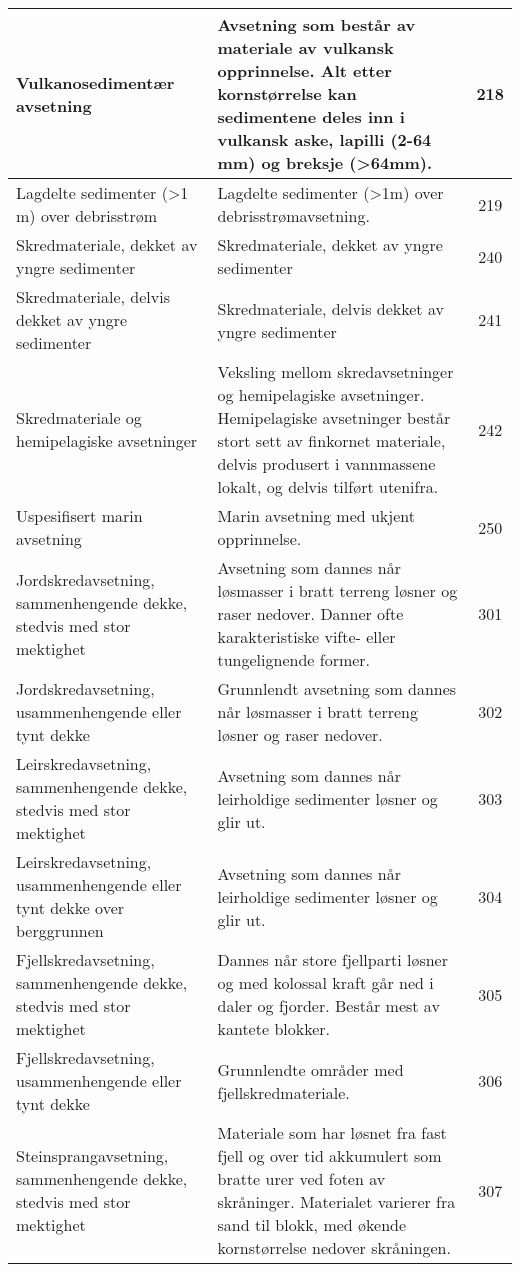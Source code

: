 \begin{longtable}{|p{3.5cm}|p{6.2cm}|c|}
    Vulkanosedimentær avsetning & Avsetning som består av materiale av vulkansk opprinnelse. Alt etter kornstørrelse kan sedimentene deles inn i vulkansk aske, lapilli (2-64 mm) og breksje (>64mm). & 218 \\ \hline
    Lagdelte sedimenter (>1 m) over debrisstrøm & Lagdelte sedimenter (>1m) over debrisstrømavsetning. & 219 \\ \hline
    Skredmateriale, dekket av yngre sedimenter & Skredmateriale, dekket av yngre sedimenter & 240 \\ \hline
    Skredmateriale, delvis dekket av yngre sedimenter & Skredmateriale, delvis dekket av yngre sedimenter & 241 \\ \hline
    Skredmateriale og hemipelagiske avsetninger & Veksling mellom skredavsetninger og hemipelagiske avsetninger. Hemipelagiske avsetninger består stort sett av finkornet materiale, delvis produsert i vannmassene lokalt, og delvis tilført utenifra. & 242 \\ \hline
    Uspesifisert marin avsetning & Marin avsetning med ukjent opprinnelse. & 250 \\ \hline
    Jordskredavsetning, sammenhengende dekke, stedvis med stor mektighet & Avsetning som dannes når løsmasser i bratt terreng løsner og raser nedover. Danner ofte karakteristiske vifte- eller tungelignende former. & 301 \\ \hline
    Jordskredavsetning, usammenhengende eller tynt dekke & Grunnlendt avsetning som dannes når løsmasser i bratt terreng løsner og raser nedover. & 302 \\ \hline
    Leirskredavsetning, sammenhengende dekke, stedvis med stor mektighet & Avsetning som dannes når leirholdige sedimenter løsner og glir ut. & 303 \\ \hline
    Leirskredavsetning, usammenhengende eller tynt dekke over berggrunnen & Avsetning som dannes når leirholdige sedimenter løsner og glir ut. & 304 \\ \hline
    Fjellskredavsetning, sammenhengende dekke, stedvis med stor mektighet & Dannes når store fjellparti løsner og med kolossal kraft går ned i daler og fjorder. Består mest av kantete blokker. & 305 \\ \hline
    Fjellskredavsetning, usammenhengende eller tynt dekke & Grunnlendte områder med fjellskredmateriale. & 306 \\ \hline
    Steinsprangavsetning, sammenhengende dekke, stedvis med stor mektighet & Materiale som har løsnet fra fast fjell og over tid akkumulert som bratte urer ved foten av skråninger. Materialet varierer fra sand til blokk, med økende kornstørrelse nedover skråningen. & 307 \\ \hline

\end{longtable}
